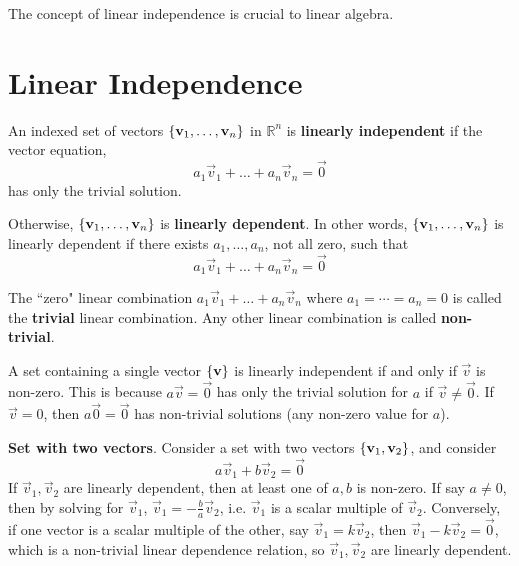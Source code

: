 \documentclass[letterpaper,12pt]{article}
\begin{document}
The concept of linear independence is crucial to linear algebra.

\section*{Linear Independence}
\begin{definition}
An indexed set of vectors $\left\{ \mathbf{v}_1, \dots, \mathbf{v}_n \right\}$ in $\mathbb{R}^n$ is \textbf{linearly independent} if the vector equation,
\begin{equation*}
    a_1 \vec{v}_1 + \dots + a_n \vec{v}_n = \vec{0}
\end{equation*}
has only the trivial solution.
\end{definition}

\begin{definition}
Otherwise, $\left\{ \mathbf{v}_1, \dots, \mathbf{v}_n \right\}$ is \textbf{linearly dependent}. In other words, $\left\{ \mathbf{v}_1, \dots, \mathbf{v}_n \right\}$ is linearly dependent if there exists $a_1, \dots, a_n$, not all zero, such that
\begin{equation*}
    a_1 \vec{v}_1 + \dots + a_n \vec{v}_n = \vec{0}
\end{equation*}
\end{definition}

The ``zero" linear combination $a_1 \vec{v}_1 + \dots + a_n \vec{v}_n$ where $a_1 = \cdots = a_n = 0$ is called the \textbf{trivial} linear combination. Any other linear combination is called \textbf{non-trivial}.

\begin{example}
A set containing a single vector $\left\{ \mathbf{v} \right\}$ is linearly independent if and only if $\vec{v}$ is non-zero. This is because $a\vec{v} = \vec{0}$ has only the trivial solution for $a$ if $\vec{v} \neq \vec{0}$. If $\vec{v} = 0$, then $a\vec{0} = \vec{0}$ has non-trivial solutions (any non-zero value for $a$).
\end{example}

\begin{example}
\textbf{Set with two vectors}. Consider a set with two vectors $\left\{ \mathbf{v}_1, \mathbf{v}_2 \right\}$, and consider
\begin{equation*}
    a \vec{v}_1 + b\vec{v}_2 = \vec{0}
\end{equation*}
If $\vec{v}_1, \vec{v}_2$ are linearly dependent, then at least one of $a, b$ is non-zero. If say $a \neq 0$, then by solving for $\vec{v}_1$, $\vec{v}_1 = -\frac{b}{a} \vec{v}_2$, i.e. $\vec{v}_1$ is a scalar multiple of $\vec{v}_2$. Conversely, if one vector is a scalar multiple of the other, say $\vec{v}_1 = k \vec{v}_2$, then $\vec{v}_1 - k \vec{v}_2 = \vec{0}$, which is a non-trivial linear dependence relation, so $\vec{v}_1, \vec{v}_2$ are linearly dependent.
\end{example}
\end{document}
